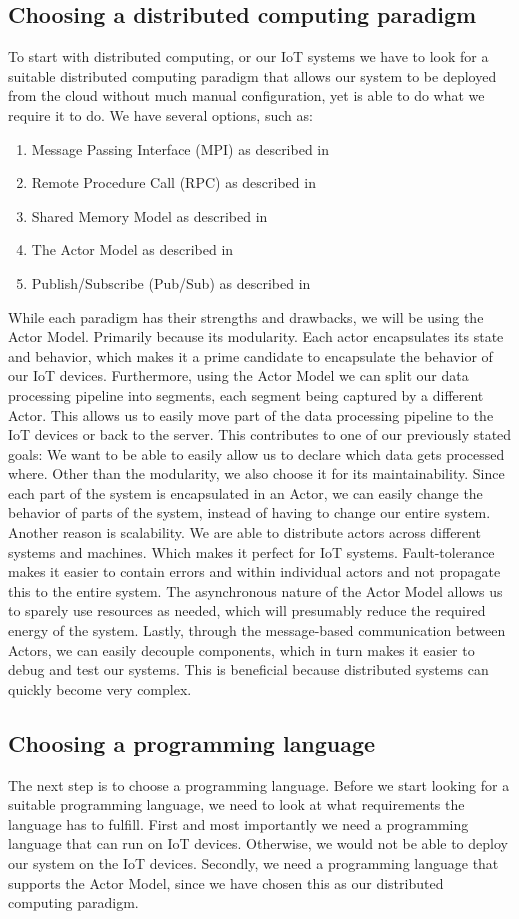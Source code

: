 \documentclass[a4paper]{article}
\begin{document}
\subsection{Choosing a distributed computing paradigm}
To start with distributed computing, or our IoT systems we have to look for a suitable distributed computing paradigm that allows our system to be deployed from the cloud without much manual configuration, yet is able to do what we require it to do. We have several options, such as:
\begin{enumerate}
    \item Message Passing Interface (MPI) as described in \cite{MPI}
    \item Remote Procedure Call (RPC) as described in \cite{RPC}
    \item Shared Memory Model as described in \cite{SMM}
    \item The Actor Model as described in \cite{ActorModel}
    \item Publish/Subscribe (Pub/Sub) as described in \cite{PubSub}
\end{enumerate}
While each paradigm has their strengths and drawbacks, we will be using the Actor Model. Primarily because its modularity. Each actor encapsulates its state and behavior, which makes it a prime candidate to encapsulate the behavior of our IoT devices. Furthermore, using the Actor Model we can split our data processing pipeline into segments, each segment being captured by a different Actor. This allows us to easily move part of the data processing pipeline to the IoT devices or back to the server. This contributes to one of our previously stated goals: We want to be able to easily allow us to declare which data gets processed where. Other than the modularity, we also choose it for its maintainability. Since each part of the system is encapsulated in an Actor, we can easily change the behavior of parts of the system, instead of having to change our entire system. Another reason is scalability. We are able to distribute actors across different systems and machines. Which makes it perfect for IoT systems. Fault-tolerance makes it easier to contain errors and within individual actors and not propagate this to the entire system. The asynchronous nature of the Actor Model allows us to sparely use resources as needed, which will presumably reduce the required energy of the system. Lastly, through the message-based communication between Actors, we can easily decouple components, which in turn makes it easier to debug and test our systems. This is beneficial because distributed systems can quickly become very complex.
\subsection{Choosing a programming language}
The next step is to choose a programming language. Before we start looking for a suitable programming language, we need to look at what requirements the language has to fulfill. First and most importantly we need a programming language that can run on IoT devices. Otherwise, we would not be able to deploy our system on the IoT devices. Secondly, we need a programming language that supports the Actor Model, since we have chosen this as our distributed computing paradigm. 
\printbibliography
\end{document}
